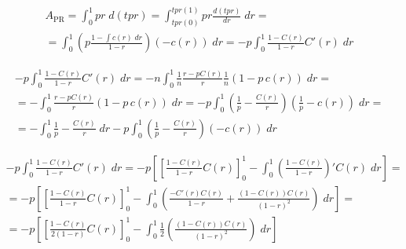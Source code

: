 



\begin{multline}
    A_\text{PR}
    = \int_{0}^{1} pr \;d(tpr)
    = \int_{tpr(0)}^{tpr(1)} pr \frac{d(tpr)}{dr} \;dr
    =\\
    = \int_{0}^{1} \left(p\frac{1 - \int c(r)\;dr}{1-r} \right) (- c(r))\;dr
    = -p\int_{0}^{1} \frac{1 - C(r)}{1-r} C'(r)\;dr
    \label{eq:aupr}
\end{multline}

\begin{multline}
    -p\int_{0}^{1} \frac{1 - C(r)}{1-r} C'(r)\;dr
    = -n\int_{0}^{1}
        \frac{1}{n}\frac{r-pC(r)}{r}
        \frac{1}{n} \left(1 - p\,c(r)\right)
    \;dr
    =\\
    = -\int_{0}^{1}
        \frac{r-pC(r)}{r}
        \left(1 - p\,c(r)\right)
    \;dr
    = -p\int_{0}^{1}
        \left(
            \frac{1}{p}-\frac{C(r)}{r}
        \right)
        \left(\frac{1}{p} - c(r)\right)
    \;dr
    =\\
    =
    -\int_{0}^{1}
        \frac{1}{p}-\frac{C(r)}{r}
    \;dr
    -p\int_{0}^{1}
        \left(
            \frac{1}{p}-\frac{C(r)}{r}
        \right)
        \left(-c(r)\right)
    \;dr
\end{multline}

\begin{multline}
    -p\int_{0}^{1} \frac{1 - C(r)}{1-r} C'(r)\;dr
    = -p \left[
        \left[\frac{1 - C(r)}{1-r} C(r)\right]_{0}^{1}
        - \int_{0}^{1} \left(\frac{1 - C(r)}{1-r}\right)' C(r)\;dr
    \right]
    =\\
    = -p \left[
        \left[\frac{1 - C(r)}{1-r} C(r)\right]_{0}^{1}
        - \int_{0}^{1} \left(
            \frac{- C'(r)C(r)}{1-r}
            + \frac{(1-C(r))C(r)}{(1-r)^2}
        \right)
        \;dr
    \right]
    =\\
    = -p \left[
        \left[\frac{1 - C(r)}{2(1-r)} C(r)\right]_{0}^{1}
        - \int_{0}^{1} \frac{1}{2}\left(
            \frac{(1-C(r))C(r)}{(1-r)^2}
        \right)
        \;dr
    \right]
\end{multline}


